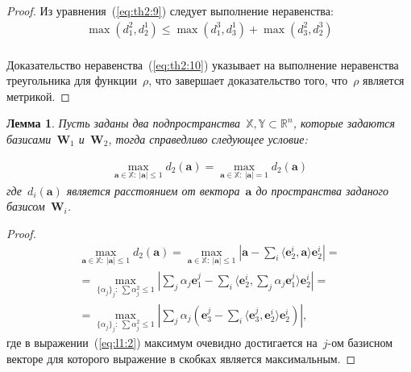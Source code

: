 \documentclass[12pt, twoside]{article}
\newtheorem{lemma}[theorem]{Лемма}
\numberwithin{equation}{section}
\begin{document}
\begin{proof}
Из уравнения~(\ref{eq:th2:9}) следует выполнение неравенства:
\begin{equation}
\label{eq:th2:10}
\begin{aligned}
\max\left(d_{1}^{2}, d_{2}^{1}\right) \leq  \max\left(d_{1}^{3}, d_{3}^{1}\right) + \max\left(d_{3}^{2}, d_{2}^{3}\right)\\
\end{aligned}
\end{equation}

Доказательство неравенства~(\ref{eq:th2:10}) указывает на выполнение неравенства треугольника для функции~$\rho$, что завершает доказательство того, что~$\rho$ является метрикой.

\end{proof}


\begin{lemma} \label{lem:1} 
Пусть заданы два подпространства~$\mathbb{X}, \mathbb{Y} \subset \mathbb{R}^{n}$, которые задаются базисами~$\textbf{W}_1$ и~$\textbf{W}_2$, тогда справедливо следующее условие:

\begin{equation}
\label{eq:l1:1}
\begin{aligned}
\max_{\textbf{a} \in \mathbb{X}:~\left|\textbf{a}\right|\leq 1}d_2\left(\textbf{a}\right) = \max_{\textbf{a} \in \mathbb{X}:~\left|\textbf{a}\right|= 1}d_2\left(\textbf{a}\right)
\end{aligned}
\end{equation}
где~$d_i\left(\textbf{a}\right)$ является расстоянием от вектора~$\textbf{a}$ до пространства заданого базисом~$\textbf{W}_i$.
\end{lemma}

\begin{proof}
\begin{equation}
\label{eq:l1:2}
\begin{aligned}
\max_{\textbf{a} \in \mathbb{X}:~\left|\textbf{a}\right|\leq 1}d_2\left(\textbf{a}\right) = \max_{\textbf{a} \in \mathbb{X}:~\left|\textbf{a}\right|\leq 1}\left|\textbf{a}-\sum_{i}\langle \textbf{e}^i_2, \textbf{a} \rangle\textbf{e}^i_2 \right| = \\ 
=\max_{\{\alpha_j\}_{j}:~\sum\alpha_j^2\leq 1}\left|\sum_{j}\alpha_j\textbf{e}^{j}_1-\sum_{i}\langle \textbf{e}^i_2, \sum_{j}\alpha_j\textbf{e}^{j}_1 \rangle\textbf{e}^i_2 \right| =\\
= \max_{\{\alpha_j\}_{j}:~\sum\alpha_j^2\leq 1}\left|\sum_{j}\alpha_j\left(\textbf{e}_3^j - \sum_{i}\langle\textbf{e}_3^j,\textbf{e}_2^i\rangle\textbf{e}_2^i\right)\right|,
\end{aligned}
\end{equation}
где в выражении~(\ref{eq:l1:2}) максимум очевидно достигается на~$j$-ом базисном векторе для которого выражение в скобках является максимальным.
\end{proof}
\end{document}
